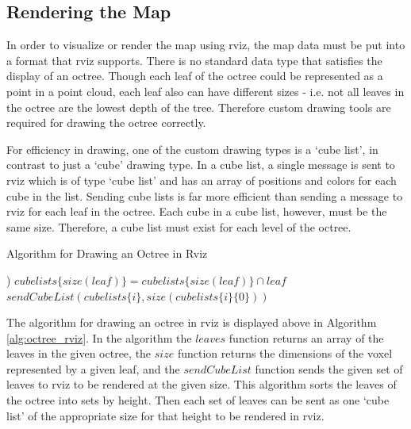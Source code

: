 \documentclass[12pt]{report}
\begin{document}
\subsection{Rendering the Map}\label{sec:rendering_the_map}
In order to visualize or render the map using rviz, the map data must be put into a format that rviz supports.  There is no standard data type that satisfies the display of an octree.  Though each leaf of the octree could be represented as a point in a point cloud, each leaf also can have different sizes - i.e. not all leaves in the octree are the lowest depth of the tree.  Therefore custom drawing tools are required for drawing the octree correctly.

For efficiency in drawing, one of the custom drawing types is a `cube list', in contrast to just a `cube' drawing type.  In a cube list, a single message is sent to rviz which is of type `cube list' and has an array of positions and colors for each cube in the list.  Sending cube lists is far more efficient than sending a message to rviz for each leaf in the octree.  Each cube in a cube list, however, must be the same size.  Therefore, a cube list must exist for each level of the octree.

\begin{algorithm}
\caption{Algorithm for Drawing an Octree in Rviz}
\label{alg:octree_rviz}
\begin{algorithmic}
  \STATE {}
  \STATE {})
    \STATE $cubelists\{size(leaf)\} = cubelists\{size(leaf)\} \cap leaf$
  \ENDFOR
    \STATE $sendCubeList(cubelists\{i\}, size(cubelists\{i\}\{0\}))$
  \ENDFOR
\end{algorithmic}
\end{algorithm}

The algorithm for drawing an octree in rviz is displayed above in Algorithm \ref{alg:octree_rviz}.  In the algorithm the $leaves$ function returns an array of the leaves in the given octree, the $size$ function returns the dimensions of the voxel represented by a given leaf, and the $sendCubeList$ function sends the given set of leaves to rviz to be rendered at the given size.  This algorithm sorts the leaves of the octree into sets by height.  Then each set of leaves can be sent as one `cube list' of the appropriate size for that height to be rendered in rviz.
\end{document}
